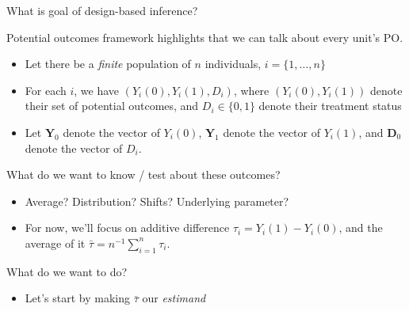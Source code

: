 \documentclass[notes,11pt, aspectratio=169]{beamer}
\newenvironment{wideitemize}{\itemize\addtolength{\itemsep}{10pt}}{\enditemize}
\begin{document}
\begin{frame}{What is goal of design-based inference?}
  \begin{wideitemize}
  \item Potential outcomes framework highlights that we can talk about every unit's PO.
    \begin{itemize}
    \item Let there be a \emph{finite} population of $n$ individuals,
      $i = \{1, \ldots, n\}$
    \item For each $i$, we have $(Y_{i}(0), Y_{i}(1), D_{i})$, where
      $(Y_{i}(0), Y_{i}(1))$ denote their set of potential outcomes,
      and $D_{i} \in \{0,1\}$ denote their treatment status
    \item Let $\mathbf{Y}_{0}$ denote the vector of $Y_{i}(0)$,
      $\mathbf{Y}_{1}$ denote the vector of $Y_{i}(1)$, and
      $\mathbf{D}_{0}$ denote the vector of $D_{i}$.
    \end{itemize}
  \item What do we want to know / test about these outcomes?
    \begin{itemize}
    \item Average? Distribution? Shifts? Underlying parameter?
    \item For now, we'll focus on additive difference
      $\tau_{i} = Y_{i}(1) - Y_{i}(0)$, and the average of it
      $\bar{\tau} = n^{-1}\sum_{i=1}^{n}\tau_{i}.$
    \end{itemize}
  \item What do we want to do?
    \begin{itemize}
    \item Let's start by making $\bar{\tau}$ our \emph{estimand}
    \end{itemize}
  \end{wideitemize}
\end{frame}
\end{document}
